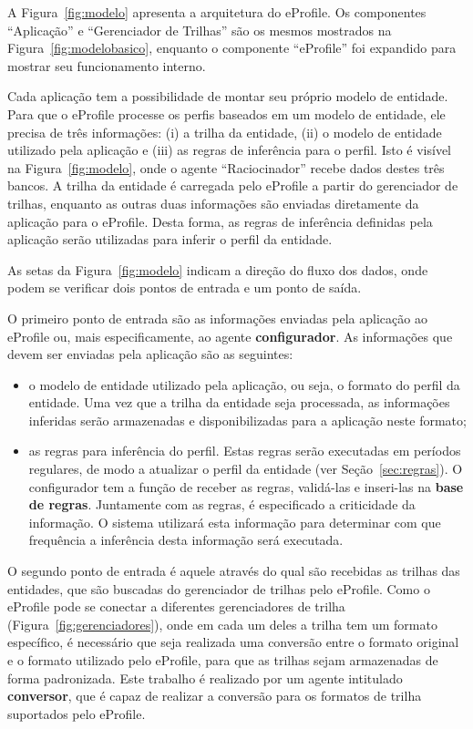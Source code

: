 A Figura~\ref{fig:modelo} apresenta a arquitetura do eProfile. Os componentes ``Aplicação'' e ``Gerenciador de Trilhas'' são os mesmos mostrados na Figura~\ref{fig:modelobasico}, enquanto o componente ``eProfile'' foi expandido para mostrar seu funcionamento interno.

Cada aplicação tem a possibilidade de montar seu próprio modelo de entidade. Para que o eProfile processe os perfis baseados em um modelo de entidade, ele precisa de três informações: (i) a trilha da entidade, (ii) o modelo de entidade utilizado pela aplicação e (iii) as regras de inferência para o perfil. Isto é visível na Figura~\ref{fig:modelo}, onde o agente ``Raciocinador'' recebe dados destes três bancos. A trilha da entidade é carregada pelo eProfile a partir do gerenciador de trilhas, enquanto as outras duas informações são enviadas diretamente da aplicação para o eProfile. Desta forma, as regras de inferência definidas pela aplicação serão utilizadas para inferir o perfil da entidade.

As setas da Figura~\ref{fig:modelo} indicam a direção do fluxo dos dados, onde podem se verificar dois pontos de entrada e um ponto de saída.

O primeiro ponto de entrada são as informações enviadas pela aplicação ao eProfile ou, mais especificamente, ao agente {\bf configurador}. As informações que devem ser enviadas pela aplicação são as seguintes:

\begin{itemize}

\item o modelo de entidade utilizado pela aplicação, ou seja, o formato do perfil da entidade. Uma vez que a trilha da entidade seja processada, as informações inferidas serão armazenadas e disponibilizadas para a aplicação neste formato;

\item as regras para inferência do perfil. Estas regras serão executadas em períodos regulares, de modo a atualizar o perfil da entidade (ver Seção~\ref{sec:regras}). O configurador tem a função de receber as regras, validá-las e inseri-las na \textbf{base de regras}. Juntamente com as regras, é especificado a criticidade da informação. O sistema utilizará esta informação para determinar com que frequência a inferência desta informação será executada.

\end{itemize}

O segundo ponto de entrada é aquele através do qual são recebidas as trilhas das entidades, que são buscadas do gerenciador de trilhas pelo eProfile. Como o eProfile pode se conectar a diferentes gerenciadores de trilha (Figura~\ref{fig:gerenciadores}), onde em cada um deles a trilha tem um formato específico, é necessário que seja realizada uma conversão entre o formato original e o formato utilizado pelo eProfile, para que as trilhas sejam armazenadas de forma padronizada. Este trabalho é realizado por um agente intitulado {\bf conversor}, que é capaz de realizar a conversão para os formatos de trilha suportados pelo eProfile.

